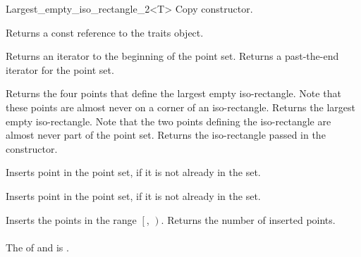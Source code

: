 \begin{ccRefClass}{Largest_empty_iso_rectangle_2<T>}
{Copy constructor.} 

%
\ccOperations
{}


{}

\ccAccessFunctions

{Returns a const reference to the traits object.}


{Returns an iterator to the beginning of the point set.}
{Returns a past-the-end iterator for the point set.}



{Returns the four points that define the largest empty iso-rectangle.
Note that these points are almost never on a corner of an iso-rectangle.}
\ccGlue
{}
{Returns the largest empty iso-rectangle. Note that the two
points defining the iso-rectangle are almost never part of 
the point set.}
\ccGlue
{}
{Returns  the iso-rectangle passed in the constructor.}

{Inserts point  in the point set, if it is not already in the set.}

{Inserts point  in the point set, if it is not already in the set.}

{Inserts the points in the range $\left[\right.$,
$\left.\right)$.  Returns the number of inserted points. \\ \\
\ccRequirements The  of  and  is .}




\end{ccRefClass}
